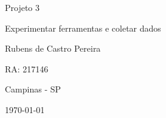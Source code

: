\begin{titlepage}
\begin{center}
\vfill


{\fontsize{28}{\baselineskip}\selectfont
Projeto 3
}

\vfill




{\fontsize{36}{\baselineskip}\selectfont
Experimentar ferramentas e coletar dados
}

\vfill



{\fontsize{20}{\baselineskip}\selectfont
Rubens de Castro Pereira

RA: 217146
}


	
    
    
    
	
	
	

\vfill





{\fontsize{14}{\baselineskip}\selectfont
	Campinas - SP

	\today
}

\end{center}
\end{titlepage}